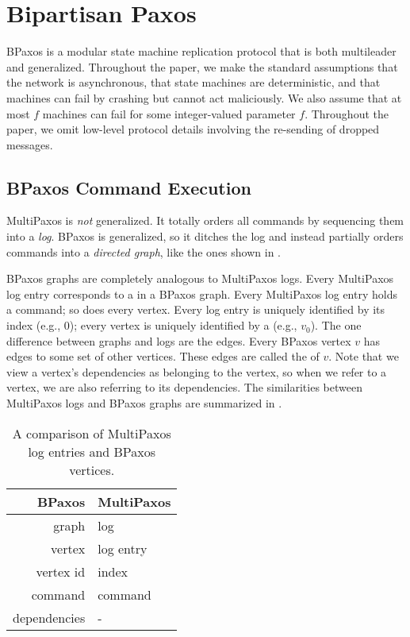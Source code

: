 \section{Bipartisan Paxos}
BPaxos is a modular state machine replication protocol that is both multileader
and generalized. Throughout the paper, we make the standard assumptions that
the network is asynchronous, that state machines are deterministic, and that
machines can fail by crashing but cannot act maliciously. We also assume that
at most $f$ machines can fail for some integer-valued parameter $f$. Throughout
the paper, we omit low-level protocol details involving the re-sending of
dropped messages.

\subsection{BPaxos Command Execution}
MultiPaxos is \emph{not} generalized. It totally orders all commands by
sequencing them into a \emph{log}. BPaxos is generalized, so it ditches the log
and instead partially orders commands into a \emph{directed graph}, like the
ones shown in .

BPaxos graphs are completely analogous to MultiPaxos logs. Every MultiPaxos log
entry corresponds to a  in a BPaxos graph. Every MultiPaxos log
entry holds a command; so does every vertex. Every log entry is uniquely
identified by its index (e.g., \textcolor{flatred}{$0$}); every vertex is
uniquely identified by a  (e.g.,
\textcolor{flatred}{$v_0$}). The one difference between graphs and logs are the
edges. Every BPaxos vertex $v$ has edges to some set of other vertices. These
edges are called the  of $v$. Note that we view a
vertex's dependencies as belonging to the vertex, so when we refer to a vertex,
we are also referring to its dependencies. The similarities between MultiPaxos
logs and BPaxos graphs are summarized in .

\begin{table}[ht]
  \centering
  \caption{A comparison of MultiPaxos log entries and BPaxos vertices.}
  \begin{tabular}{r|l}
    \textbf{BPaxos} & \textbf{MultiPaxos} \\\hline
    graph           & log \\
    vertex          & log entry \\
    vertex id       & index \\
    command         & command \\
    dependencies    & - \\
  \end{tabular}
\end{table}

